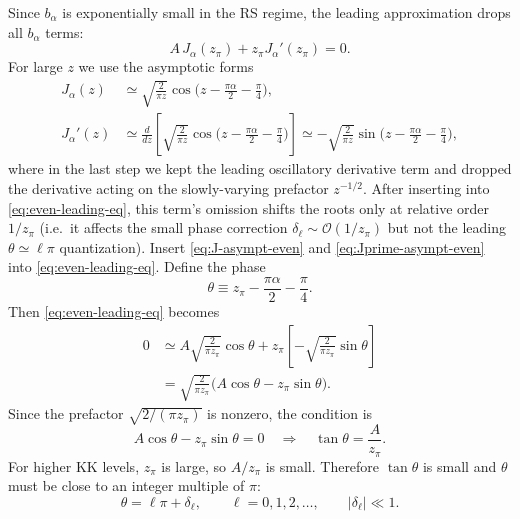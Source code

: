 \documentclass[11pt]{article}
\begin{document}
Since $b_\alpha$ is exponentially small in the RS regime, the leading approximation drops all
$b_\alpha$ terms:
\begin{equation}
A\,J_\alpha(z_\pi)+z_\pi J_\alpha'(z_\pi)=0.
\label{eq:even-leading-eq}
\end{equation}
For large $z$ we use the asymptotic forms
\begin{align}
J_\alpha(z) &\simeq \sqrt{\frac{2}{\pi z}}
\cos\!\Big(z-\frac{\pi\alpha}{2}-\frac{\pi}{4}\Big),
\label{eq:J-asympt-even}
\\[4pt]
J_\alpha'(z) &\simeq \frac{d}{dz}\left[\sqrt{\frac{2}{\pi z}}
\cos\!\Big(z-\frac{\pi\alpha}{2}-\frac{\pi}{4}\Big)\right]
\simeq -\sqrt{\frac{2}{\pi z}}
\sin\!\Big(z-\frac{\pi\alpha}{2}-\frac{\pi}{4}\Big),
\label{eq:Jprime-asympt-even}
\end{align}
where in the last step we kept the leading oscillatory derivative term and dropped the derivative
acting on the slowly-varying prefactor $z^{-1/2}$. After inserting into \eqref{eq:even-leading-eq},
this term's omission shifts the roots only at relative order $1/z_\pi$ (i.e.\ it affects the small phase
correction $\delta_\ell\sim \mathcal O(1/z_\pi)$ but not the leading $\theta\simeq \ell\pi$ quantization).
Insert \eqref{eq:J-asympt-even} and \eqref{eq:Jprime-asympt-even} into \eqref{eq:even-leading-eq}.
Define the phase
\begin{equation}
\theta \equiv z_\pi-\frac{\pi\alpha}{2}-\frac{\pi}{4}.
\label{eq:theta-def}
\end{equation}
Then \eqref{eq:even-leading-eq} becomes
\begin{align}
0
&\simeq
A\sqrt{\frac{2}{\pi z_\pi}}\cos\theta
+z_\pi\left[-\sqrt{\frac{2}{\pi z_\pi}}\sin\theta\right]
\nonumber\\[4pt]
&=\sqrt{\frac{2}{\pi z_\pi}}\Big(A\cos\theta - z_\pi\sin\theta\Big).
\label{eq:even-phase-eq}
\end{align}
Since the prefactor $\sqrt{2/(\pi z_\pi)}$ is nonzero, the condition is
\begin{equation}
A\cos\theta - z_\pi\sin\theta=0
\quad\Longrightarrow\quad
\tan\theta=\frac{A}{z_\pi}.
\label{eq:tan-theta}
\end{equation}
For higher KK levels, $z_\pi$ is large, so $A/z_\pi$ is small. Therefore $\tan\theta$ is small
and $\theta$ must be close to an integer multiple of $\pi$:
\begin{equation}
\theta = \ell\pi + \delta_\ell,\qquad \ell=0,1,2,\dots,\qquad |\delta_\ell|\ll 1.
\label{eq:theta-expand}
\end{equation}
\end{document}
